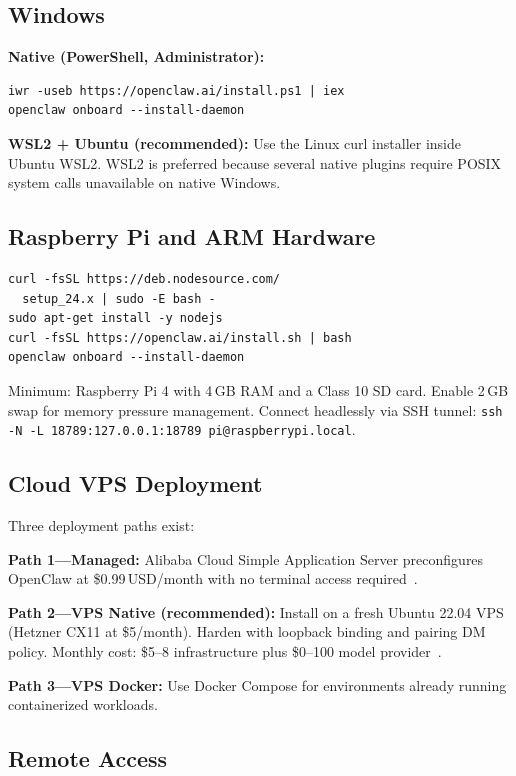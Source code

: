 \documentclass[journal]{IEEEtran}
\begin{document}
\subsection{Windows}

\textbf{Native (PowerShell, Administrator):}
\begin{verbatim}
iwr -useb https://openclaw.ai/install.ps1 | iex
openclaw onboard --install-daemon
\end{verbatim}

\textbf{WSL2 + Ubuntu (recommended):} Use the Linux curl installer inside
Ubuntu WSL2. WSL2 is preferred because several native plugins require POSIX
system calls unavailable on native Windows.

\subsection{Raspberry Pi and ARM Hardware}

\begin{verbatim}
curl -fsSL https://deb.nodesource.com/
  setup_24.x | sudo -E bash -
sudo apt-get install -y nodejs
curl -fsSL https://openclaw.ai/install.sh | bash
openclaw onboard --install-daemon
\end{verbatim}

Minimum: Raspberry Pi 4 with 4\,GB RAM and a Class 10 SD card. Enable 2\,GB
swap for memory pressure management. Connect headlessly via SSH tunnel:
\texttt{ssh -N -L 18789:127.0.0.1:18789 pi@raspberrypi.local}.

\subsection{Cloud VPS Deployment}

Three deployment paths exist:

\textbf{Path 1---Managed:} Alibaba Cloud Simple Application Server preconfigures
OpenClaw at \$0.99\,USD/month with no terminal access required~\cite{openclaw2024docs}.

\textbf{Path 2---VPS Native (recommended):} Install on a fresh Ubuntu 22.04
VPS (Hetzner CX11 at \$5/month). Harden with loopback binding and pairing DM
policy. Monthly cost: \$5--8 infrastructure plus \$0--100 model
provider~\cite{openclaw2024docs}.

\textbf{Path 3---VPS Docker:} Use Docker Compose for environments already
running containerized workloads.

\subsection{Remote Access}
\end{document}
